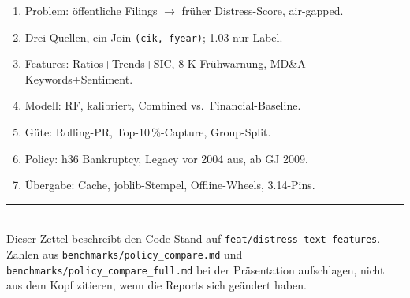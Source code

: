 \documentclass[11pt,a4paper]{article}
\newcommand{\file}[1]{\texttt{\small #1}}
\begin{document}
\begin{enumerate}[leftmargin=1.4em]
  \item Problem: öffentliche Filings $\rightarrow$ früher Distress-Score, air-gapped.
  \item Drei Quellen, ein Join \texttt{(cik, fyear)}; 1.03 nur Label.
  \item Features: Ratios+Trends+SIC, 8-K-Frühwarnung, MD\&A-Keywords+Sentiment.
  \item Modell: RF, kalibriert, Combined vs.\ Financial-Baseline.
  \item Güte: Rolling-PR, Top-10\,\%-Capture, Group-Split.
  \item Policy: h36 Bankruptcy, Legacy vor 2004 aus, ab GJ 2009.
  \item Übergabe: Cache, joblib-Stempel, Offline-Wheels, 3.14-Pins.
\end{enumerate}

\vspace{1.2em}
\noindent\textcolor{secpdblue}{\rule{\textwidth}{0.6pt}}\\[0.4em]
{\small
Dieser Zettel beschreibt den Code-Stand auf \texttt{feat/distress-text-features}.
Zahlen aus \file{benchmarks/policy\_compare.md} und
\file{benchmarks/policy\_compare\_full.md} bei der Präsentation aufschlagen,
nicht aus dem Kopf zitieren, wenn die Reports sich geändert haben.}
\end{document}
